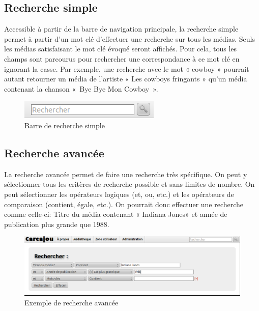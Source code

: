 \documentclass[letter, 11pt]{report}
\begin{document}
\subsection{Recherche simple}
Accessible à partir de la barre de navigation principale, la recherche simple permet à partir d'un mot clé d'effectuer une recherche sur tous les médias. Seuls les médias satisfaisant le mot clé évoqué seront affichés. Pour cela, tous les champs sont parcourus pour rechercher une correspondance à ce mot clé en ignorant la casse. Par exemple, une recherche avec le mot « cowboy » pourrait autant retourner un média de l'artiste « Les cowboys fringants » qu'un média contenant la chanson «~Bye Bye Mon Cowboy~».

\begin{figure}[htbp]
	\begin{center}
		\includegraphics[scale=0.5]{captures_ecran/barre_recherche_simple.png}
	\end{center}
	\caption{Barre de recherche simple}
\end{figure}

\subsection{Recherche avancée}
\label{sec:recherche-avancée}
La recherche avancée permet de faire une recherche très spécifique. On peut y sélectionner tous les critères de recherche possible et sans limites de nombre. On peut sélectionner les opérateurs logiques (et, ou, etc.) et les opérateurs de comparaison (contient, égale, etc.). On pourrait donc effectuer une recherche comme celle-ci: Titre du média contenant « Indiana Jones» et année de publication plus grande que 1988.

\begin{figure}[htbp]
	\begin{center}
		\includegraphics[scale=0.5]{captures_ecran/exemple_recherche_avancee.png}
	\end{center}
	\caption{Exemple de recherche avancée}
\end{figure}
\end{document}

